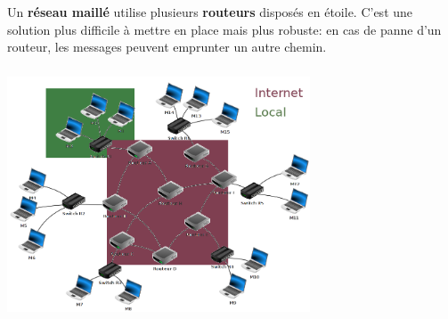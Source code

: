 \documentclass[svgnames,11pt]{beamer}
\begin{document}
\begin{frame}
    \frametitle{}

    \begin{aretenir}[]
    Un \textbf{réseau maillé} utilise plusieurs \textbf{routeurs} disposés en étoile. C'est une solution plus difficile à mettre en place mais plus robuste: en cas de panne d'un routeur, les messages peuvent emprunter un autre chemin.
    \end{aretenir}

\end{frame}
\begin{frame}
    \frametitle{}

    \begin{center}
    \centering
    \includegraphics[width=9cm]{ressources/reseaux.png}
    \label{IMG}
    \end{center}

\end{frame}
\end{document}
